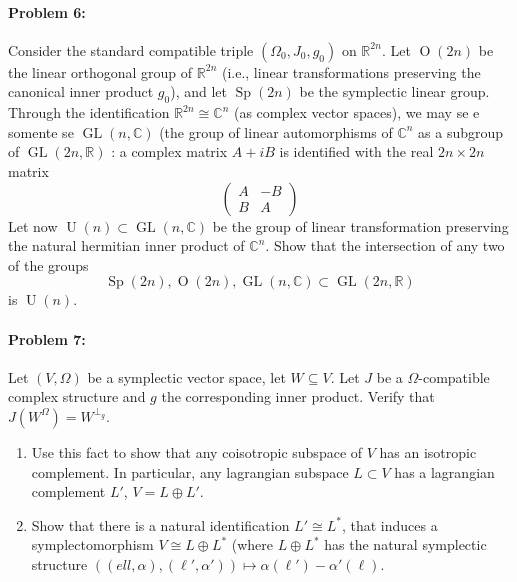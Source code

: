  \paragraph{Problem 6:} Consider the standard compatible triple $(\Omega_0,J_0,g_0)$ on $\mathbb{R}^{2n}$. Let $\operatorname{O}(2n)$ be the linear orthogonal group of $\mathbb{R}^{2n}$ (i.e., linear transformations preserving the canonical inner product $g_0$), and let $\operatorname{Sp}(2n)$ be the symplectic linear group. Through the identification $\mathbb{R}^{2n}\cong \mathbb{C}^{n}$ (as complex vector spaces), we may se e somente se $\operatorname{GL}(n,\mathbb{C})$ (the group of linear automorphisms of $\mathbb{C}^{n}$ as a subgroup of $\operatorname{GL}(2n,\mathbb{R})$ : a complex matrix $A+iB$ is identified with the real $2n\times 2n$ matrix
 \[\begin{pmatrix}A&-B\\B&A\end{pmatrix}\]
Let now $\operatorname{U}(n)\subset\operatorname{GL}(n,\mathbb{C})$ be the group of linear transformation preserving the natural hermitian inner product of $\mathbb{C}^{n}$. Show that the intersection of any two of the groups
\[\operatorname{Sp}(2n),\operatorname{O}(2n),\operatorname{GL}(n,\mathbb{C})\subset\operatorname{GL}(2n,\mathbb{R})\]
is $\operatorname{U}(n)$.

\paragraph{Problem 7:} Let $(V,\Omega)$ be a symplectic vector space, let $W\subseteq V$. Let $J$ be a $\Omega$-compatible complex structure and $g$ the corresponding inner product. Verify that $J(W^{\Omega} )=W^{\perp_{g}}$.
\begin{enumerate}[label=\alph*.]
	\item Use this fact to show that any coisotropic subspace of $V$ has an isotropic complement. In particular, any lagrangian subspace $L\subset V$ has a lagrangian complement $L'$, $V=L\oplus L'$.
	
	\item Show that there is a natural identification $L'\cong L^{*}$, that induces a symplectomorphism $V\cong L\oplus L^{*}$ (where $L\oplus L^{*}$ has the natural symplectic structure $\left( (ell,\alpha),(\ell',\alpha') \right) \mapsto \alpha(\ell')-\alpha'(\ell)$.
\end{enumerate}

